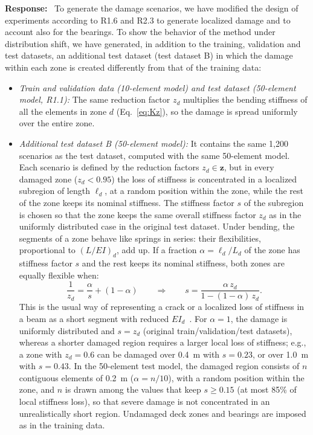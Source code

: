 \documentclass[11pt]{article}
\newenvironment{response}{\par\smallskip\noindent\color{resp}\textbf{Response:}\ }{\par}
\begin{document}
\begin{response}
To generate the damage scenarios, we have modified the design of experiments according to R1.6 and R2.3 to generate localized damage and to account also for the bearings. 
To show the behavior of the method under distribution shift, we have generated, in addition to the training, validation and test datasets, an additional test dataset (test dataset B) in which the damage within each zone is created differently from that of the training data: 
\begin{itemize}[leftmargin=*]
	\item \emph{Train and validation data (10-element model) and test dataset (50-element model, R1.1):} The same reduction factor $z_d$ multiplies the bending stiffness of all the elements in zone $d$ (Eq.~\eqref{eq:Kz}), so the damage is spread uniformly over the entire zone. 

	
	\item \emph{Additional test dataset B (50-element model):} It contains the same 1,200 scenarios as the test dataset, computed with the same 50-element model. Each scenario is defined by the reduction factors $z_d \in \mathbf{z}$, but in every damaged zone ($z_d<0.95$) the loss of stiffness is concentrated in a localized subregion of length $\ell_d$, at a random position within the zone, while the rest of the zone keeps its nominal stiffness.
	The stiffness factor $s$ of the subregion is chosen so that the zone keeps the same overall stiffness factor $z_d$ as in the uniformly distributed case in the original test dataset.  Under bending, the segments of a zone behave like springs in series: their flexibilities, proportional to $(L/EI)_{d}$, add up. 
	If a fraction $\alpha=\ell_d/L_{d}$ of the zone has stiffness factor $s$ and the rest keeps its nominal stiffness, both zones are equally flexible when:
	\begin{equation}
		\frac{1}{z_d}=\frac{\alpha}{s}+(1-\alpha)
		\qquad\Longrightarrow\qquad
		s=\frac{\alpha\,z_d}{1-(1-\alpha)\,z_d}.
		\label{eq:localized}
	\end{equation}
	This is the usual way of representing a crack or a localized loss of stiffness in a beam as a short segment with reduced $EI_d$~\cite{sinha2002simplified}. 
	For $\alpha=1$, the damage is uniformly distributed and $s=z_d$  (original train/validation/test datasets), whereas a shorter damaged region requires a larger local loss of stiffness; e.g., a zone with $z_d=0.6$ can be damaged over 0.4~m with $s=0.23$, or over 1.0~m with $s=0.43$.
	In the 50-element test model, the damaged region consists of $n$ contiguous elements of 0.2~m ($\alpha=n/10$), with a random position within the zone, and $n$ is drawn among the values that keep $s\ge0.15$ (at most 85\% of local stiffness loss), so that severe damage is not concentrated in an unrealistically short region.
	Undamaged deck zones and bearings are imposed as in the training data.
\end{itemize}


\end{response}
\end{document}
